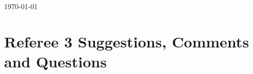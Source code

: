 \documentclass[11pt,english]{article}
\begin{document}


\makeatletter
{\def\@currentlabel{1}\label{introduction}}
{\def\@currentlabel{2}\label{institutions}}
{\def\@currentlabel{3}\label{identification}}
{\def\@currentlabel{1}\label{eq:main}}
{\def\@currentlabel{4}\label{results}}
{\def\@currentlabel{4.1}\label{main_results}}
{\def\@currentlabel{4.2}\label{sec:spillovers}}
{\def\@currentlabel{4.3}\label{heterogeneity}}
{\def\@currentlabel{4.4}\label{mechanisms}}
{\def\@currentlabel{5}\label{conclusions}}
{\def\@currentlabel{A}\label{sec:appendixA}}
{\def\@currentlabel{B}\label{sec:appendixB}}
{\def\@currentlabel{B.4}\label{resources_plan_cuadrante}}
{\def\@currentlabel{C}\label{sec:appendixC}}
{\def\@currentlabel{C.4}\label{sec:admin_uncapped}}
{\def\@currentlabel{C.5}\label{sec:bonferroni}}
{\def\@currentlabel{C.8}\label{sec:earthquake}}
\makeatother

\doublespacing
\begin{flushright}
\today \\[24pt]
\end{flushright}
\setcounter{Ref}{3}
\setcounter{RefComment}{0}
\setcounter{table}{0}
\setcounter{figure}{0}
\section*{Referee 3 Suggestions, Comments and Questions}
\begin{bibunit}

\putbib
\end{bibunit}
\FloatBarrier
\end{document}
